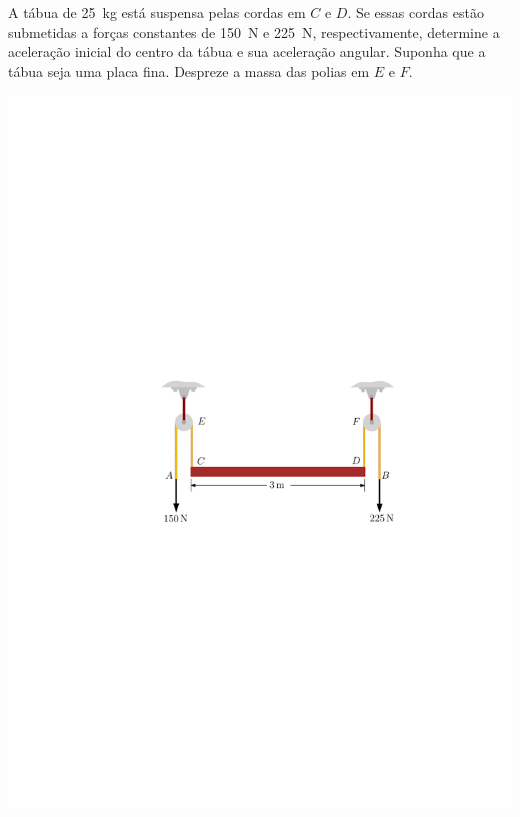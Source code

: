 \item A tábua de \SI{25}{\kilogram} está suspensa pelas cordas em $C$ e $D$. Se essas cordas estão submetidas a forças constantes de \SI{150}{\newton} e \SI{225}{\newton}, respectivamente, determine a aceleração inicial do centro da tábua e sua aceleração angular. Suponha que a tábua seja uma placa fina. Despreze a massa das polias em $E$ e $F$.

\begin{flushright}
	\includegraphics[scale=1]{../../images/draw_10}
\end{flushright}